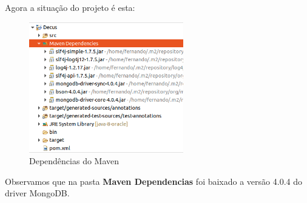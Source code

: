 \documentclass[a4paper,11pt]{article}
\begin{document}
Agora a situação do projeto é esta:
\begin{figure}[H]
	\centering
	\includegraphics[width=0.6\textwidth]{imagens/dependenciasMaven.png}
	\caption{Dependências do Maven}
\end{figure}

Observamos que na pasta \textbf{Maven Dependencias} foi baixado a versão 4.0.4 do driver MongoDB.
\end{document}
